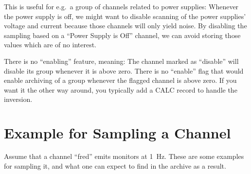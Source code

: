 This is useful for e.g.\ a group of channels related to power
supplies: Whenever the power supply is off, we might want to disable
scanning of the power supplies' voltage and current because those
channels will only yield noise. By disabling the sampling based on a
``Power Supply is Off'' channel, we can avoid storing those values
which are of no interest.

\NOTE There is no ``enabling'' feature, meaning: The channel
marked as ``disable'' will disable its group whenever it is above
zero. There is no ``enable'' flag that would enable archiving of a group
whenever the flagged channel is above zero.
If you want it the other way around, you typically add a CALC record
to handle the inversion.

\section{Example for Sampling a Channel}
Assume that a channel ``fred'' emits monitors at 1~Hz.
These are some examples for sampling it, and what one can expect to
find in the archive as a result.
